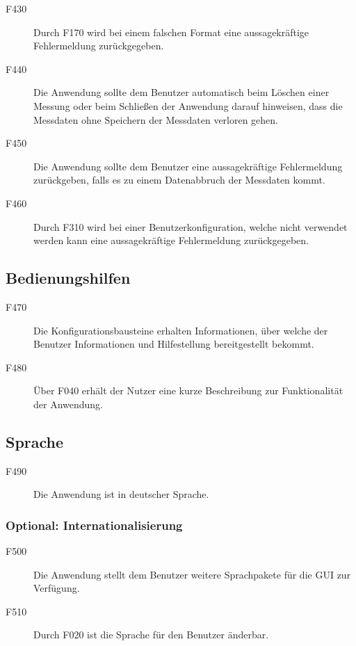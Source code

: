 \documentclass[parskip=full]{scrartcl}
\begin{document}
\begin{description}
\item[F430] Durch F170 wird bei einem falschen Format eine aussagekräftige Fehlermeldung zurückgegeben.
\item[F440] Die Anwendung sollte dem Benutzer automatisch beim Löschen einer Messung oder beim Schließen der Anwendung darauf hinweisen, dass die Messdaten ohne Speichern der Messdaten verloren gehen.
\item[F450] Die Anwendung sollte dem Benutzer eine aussagekräftige Fehlermeldung zurückgeben, falls es zu einem Datenabbruch der Messdaten kommt.
\item[F460] Durch F310 wird bei einer \gls{Benutzerkonfiguration}, welche nicht verwendet werden kann eine aussagekräftige Fehlermeldung zurückgegeben.

\end{description}

\subsection{Bedienungshilfen}

\begin{description}

\item[F470] Die Konfigurationsbausteine erhalten Informationen, über welche der Benutzer Informationen und Hilfestellung bereitgestellt bekommt.
\item[F480] Über F040 erhält der Nutzer eine kurze Beschreibung zur Funktionalität der Anwendung.

\end{description}

\subsection{Sprache}

\begin{description}

\item[F490] Die Anwendung ist in deutscher Sprache.

\end{description}

\subsubsection{Optional: Internationalisierung}

\begin{description}

\item[F500] Die Anwendung stellt dem Benutzer weitere Sprachpakete für die \gls{GUI} zur Verfügung.
\item[F510] Durch F020 ist die Sprache für den Benutzer änderbar.

\end{description}
\end{document}
